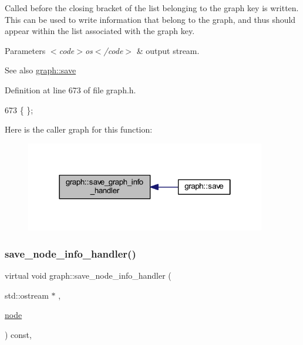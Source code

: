 Called before the closing bracket of the list belonging to the graph key is written. This can be used to write information that belong to the graph, and thus should appear within the list associated with the graph key.


\begin{DoxyParams}{Parameters}
{\em $<$code$>$os$<$/code$>$} & output stream. \\
\hline
\end{DoxyParams}
\begin{DoxySeeAlso}{See also}
\mbox{\hyperlink{classgraph_a7bd0712a528249d1585085a64ac3e661}{graph\+::save}} 
\end{DoxySeeAlso}


Definition at line 673 of file graph.\+h.


\begin{DoxyCode}
673 \{ \};
\end{DoxyCode}
Here is the caller graph for this function\+:\nopagebreak
\begin{figure}[H]
\begin{center}
\leavevmode
\includegraphics[width=298pt]{classgraph_a0f20022d6f4951b8836a204aa85b7693_icgraph}
\end{center}
\end{figure}
\mbox{\label{classgraph_a994f87e1b7f1f723cf03e54e2eb7a99d}} 
\subsubsection{\texorpdfstring{save\+\_\+node\+\_\+info\+\_\+handler()}{save\_node\_info\_handler()}}
{\footnotesize\ttfamily virtual void graph\+::save\+\_\+node\+\_\+info\+\_\+handler (\begin{DoxyParamCaption}\item[{std\+::ostream $\ast$}]{,  }\item[{\mbox{\hyperlink{classnode}{node}}}]{ }\end{DoxyParamCaption}) const\hspace{0.3cm}{\ttfamily [inline]}, {\ttfamily [virtual]}}

